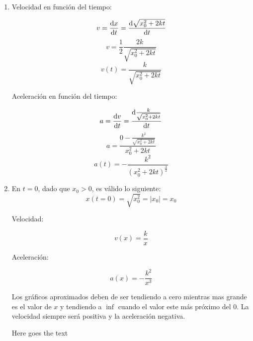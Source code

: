 \begin{enumerate}

\item

	Velocidad en funci\'on del tiempo:

	$$ v = \dv{x}{t} = \dv{\sqrt{x_0^2+2kt}}{t} $$
	$$ v = \frac{1}{2}\frac{2k}{\sqrt{x_0^2+2kt} }$$
	$$ v(t) = \frac{k}{\sqrt{x_0^2+2kt}} $$
	
	Aceleraci\'on en funci\'on del tiempo:
	
	$$ a = \dv{v}{t} = \dv{\frac{k}{\sqrt{x_0^2+2kt}}}{t} $$
	$$ a = \frac{0 - \frac{k^2}{\sqrt{x_0^2+2kt}}}{x_0^2+2kt} $$
	$$ a(t) = -\frac{k^2}{(x_0^2+2kt)^\frac{3}{2}} $$
	
\item
	
	En $t = 0$, dado que $x_0 > 0$, es v\'alido lo siguiente:
	$$ x(t = 0) = \sqrt{x_0^2} = \left| x_0 \right| = x_0 $$
	
	Velocidad:
	
	$$ v(x) = \frac{k}{x}$$
	
	Aceleraci\'on:
	
	$$ a(x) = -\frac{k^2}{x^3}$$
	
	Los gr\'aficos aproximados deben de ser tendiendo a cero mientras mas grande es el valor de $x$ y tendiendo a $\inf$ cuando el valor este m\'as pr\'oximo del $0$. La velocidad siempre ser\'a positiva y la aceleraci\'on negativa. 


   
   Here goes the text




\end{enumerate}